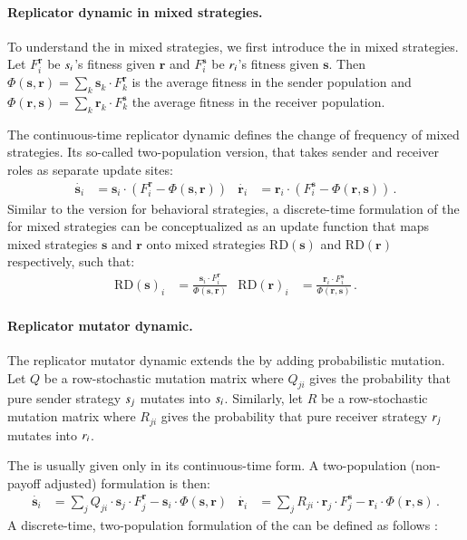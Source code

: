 \documentclass[fleqn,reqno,10pt]{article}
\renewcommand{\Smixed}{\ensuremath{\mathrm{\mathbf{s}}}}
\renewcommand{\Rmixed}{\ensuremath{\mathrm{\mathbf{r}}}}
\newcommand{\rd}{\acro{rd}} %
\newcommand{\rmd}{\acro{rmd}} %
\newcommand{\RD}{\ensuremath{\mathrm{RD}}} %
\begin{document}
\paragraph{Replicator dynamic in mixed strategies.} To understand the
\rmd in mixed strategies, we first introduce the \rd in mixed
strategies. Let $F_i^{\Rmixed}$ be $s_i$'s fitness given
$\Rmixed$ and $F_i^{\Smixed}$ be $r_i$'s fitness given
$\Smixed$. Then $\Phi(\Smixed,\Rmixed) = \sum_{k} \Smixed_k \cdot
F_k^{\Rmixed}$ is the average fitness in the sender population and
$\Phi(\Rmixed,\Smixed) = \sum_{k} \Rmixed_k \cdot F_k^{\Smixed}$ the
average fitness in the receiver population.

The continuous-time replicator dynamic defines the change of frequency
of mixed strategies. Its so-called two-population version, that takes
sender and receiver roles as separate update sites:
\begin{align*}
  \dot{\Smixed_i} & = \Smixed_i \cdot \left ( F_i^{\Rmixed} -
  \Phi(\Smixed,\Rmixed) \right ) &   \dot{\Rmixed_i} &  = \Rmixed_i \cdot \left ( F_i^{\Smixed} -
  \Phi(\Rmixed,\Smixed) \right ) \,.
\end{align*}
Similar to the version for behavioral strategies, a discrete-time
formulation of the \rd for mixed strategies can be conceptualized as an
update function that maps mixed strategies $\Smixed$ and $\Rmixed$
onto mixed strategies $\RD(\Smixed)$ and $\RD(\Rmixed)$ respectively,
such that:
\begin{align*}
  \RD(\Smixed)_i & = \frac{\Smixed_i \cdot F_i^{\Rmixed}}{
    \Phi(\Smixed,\Rmixed)} & \RD(\Rmixed)_i & = \frac{\Rmixed_i \cdot
    F_i^{\Smixed}}{ \Phi(\Rmixed,\Smixed)} \,.
\end{align*}


\paragraph{Replicator mutator dynamic.} The replicator mutator dynamic
extends the \rd by adding probabilistic mutation. Let $Q$ be a
row-stochastic mutation matrix where $Q_{ji}$ gives the probability
that pure sender strategy $s_j$ mutates into
$s_i$. Similarly, let $R$ be a row-stochastic mutation matrix
where $R_{ji}$ gives the probability that pure receiver strategy
$r_j$ mutates into $r_i$.

The \rmd is usually given only in its continuous-time form. A
two-population (non-payoff adjusted) formulation is then:
\begin{align*}
  \dot{\Smixed_i} & = \sum_{j}  Q_{ji} \cdot \Smixed_j
    \cdot F_j^{\Rmixed} - \Smixed_i \cdot \Phi(\Smixed,\Rmixed) &
    \dot{\Rmixed_i} & = \sum_{j}  R_{ji} \cdot \Rmixed_j
    \cdot F_j^{\Smixed} - \Rmixed_i \cdot \Phi(\Rmixed,\Smixed) \,.
\end{align*}
A discrete-time, two-population formulation of the \rmd can be defined as follows 
\citep[c.f.][97]{PageNowak2002:Unifying-Evolut}:
\end{document}
